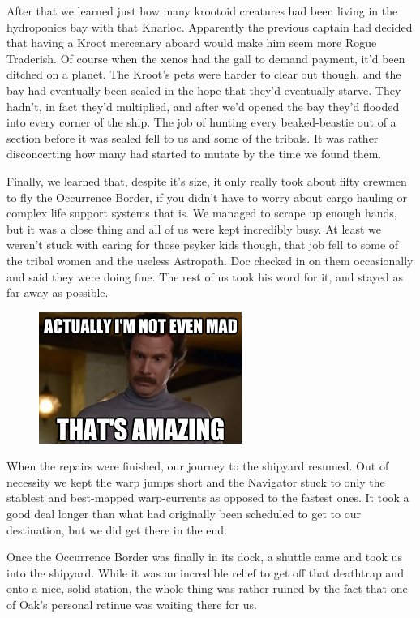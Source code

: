 After that we learned just how many krootoid creatures had been living in the hydroponics bay with that Knarloc. 
Apparently the previous captain had decided that having a Kroot mercenary aboard would make him seem more Rogue Traderish. 
Of course when the xenos had the gall to demand payment, it’d been ditched on a planet. 
The Kroot’s pets were harder to clear out though, and the bay had eventually been sealed in the hope that they’d eventually starve. 
They hadn’t, in fact they’d multiplied, and after we’d opened the bay they’d flooded into every corner of the ship. 
The job of hunting every beaked-beastie out of a section before it was sealed fell to us and some of the tribals. 
It was rather disconcerting how many had started to mutate by the time we found them.

Finally, we learned that, despite it’s size, it only really took about fifty crewmen to fly the Occurrence Border, if you didn’t have to worry about cargo hauling or complex life support systems that is. 
We managed to scrape up enough hands, but it was a close thing and all of us were kept incredibly busy. 
At least we weren’t stuck with caring for those psyker kids though, that job fell to some of the tribal women and the useless Astropath. 
Doc checked in on them occasionally and said they were doing fine. 
The rest of us took his word for it, and stayed as far away as possible.

\begin{figure}
	\begin{center}
		\includegraphics[width=\figwidth]{pics/7/52.png}
	\end{center}
\end{figure}
When the repairs were finished, our journey to the shipyard resumed. 
Out of necessity we kept the warp jumps short and the Navigator stuck to only the stablest and best-mapped warp-currents as opposed to the fastest ones. 
It took a good deal longer than what had originally been scheduled to get to our destination, but we did get there in the end. 


Once the Occurrence Border was finally in its dock, a shuttle came and took us into the shipyard. 
While it was an incredible relief to get off that deathtrap and onto a nice, solid station, the whole thing was rather ruined by the fact that one of Oak’s personal retinue was waiting there for us.

